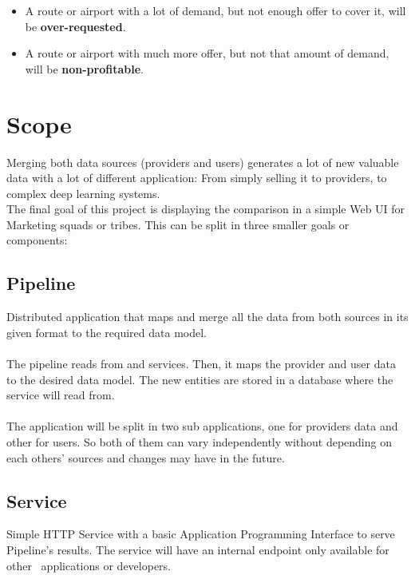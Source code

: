 \begin{itemize}
  \item A route or airport with a lot of demand, but not enough offer to cover it, will be \textbf{over-requested}.
  \item A route or airport with much more offer, but not that amount of demand, will be \textbf{non-profitable}.
\end{itemize}


\section{Scope}

Merging both data sources (providers and users) generates a lot of new valuable data with a lot of different application: From simply selling it to providers, to complex deep learning systems.
\\
The final goal of this project is displaying the comparison in a simple Web UI for Marketing squads or tribes. This can be split in three smaller goals or components:

\subsection{Pipeline}

Distributed application that maps and merge all the data from both sources in its given format to the required data model.
\\\\
The pipeline reads from  and  services. Then, it maps the provider and user data to the desired data model. The new entities are stored in a database where the service will read from.
\\\\
The application will be split in two sub applications, one for providers data and other for users. So both of them can vary independently without depending on each others' sources and changes may have in the future.

\subsection{Service}

Simple HTTP Service with a basic Application Programming Interface to serve Pipeline's results. The service will have an internal endpoint only available for other \company\ applications or developers.

